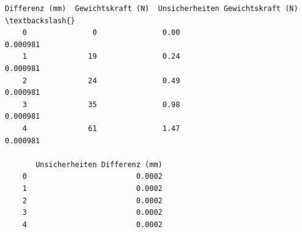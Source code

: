\documentclass[11pt]{article}
\makeatletter
\newcommand{\boxspacing}{\kern\kvtcb@left@rule\kern\kvtcb@boxsep}
\newcommand{\prompt}[4]{
    {\ttfamily\llap{{\color{#2}[#3]:\hspace{3pt}#4}}\vspace{-\baselineskip}}
}
\makeatother
\begin{document}
            \begin{tcolorbox}[breakable, size=fbox, boxrule=.5pt, pad at break*=1mm, opacityfill=0]
    \prompt{Out}{outcolor}{ }{\boxspacing}
    \begin{Verbatim}[commandchars=\\\{\}]
       Differenz (mm)  Gewichtskraft (N)  Unsicherheiten Gewichtskraft (N)  \textbackslash{}
    0               0               0.00                          0.000981
    1              19               0.24                          0.000981
    2              24               0.49                          0.000981
    3              35               0.98                          0.000981
    4              61               1.47                          0.000981
    
       Unsicherheiten Differenz (mm)
    0                         0.0002
    1                         0.0002
    2                         0.0002
    3                         0.0002
    4                         0.0002
    \end{Verbatim}
    \end{tcolorbox}
    \newpage
        
\end{document}

